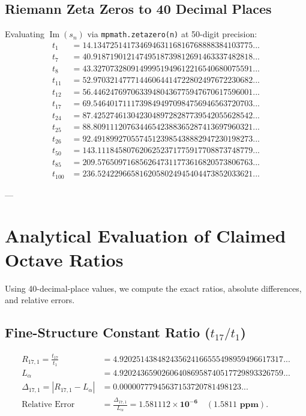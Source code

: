 \documentclass[11pt,a4paper]{article}
\begin{document}
\subsection{Riemann Zeta Zeros to 40 Decimal Places}
Evaluating $\operatorname{Im}(s_n)$ via \texttt{mpmath.zetazero(n)} at 50-digit precision:
\begin{align}
t_1 &= \mathbf{14.13472514173469463116816768888384103775...} \\
t_7 &= \mathbf{40.91871901214749518739812691463337482818...} \\
t_8 &= \mathbf{43.32707328091499951949612216540680075591...} \\
t_{11} &= \mathbf{52.97032147771446064414722802497672230682...} \\
t_{12} &= \mathbf{56.44624769706339480436775947670617596001...} \\
t_{17} &= \mathbf{69.54640171117398494970984756946563720703...} \\
t_{24} &= \mathbf{87.42527461304230489728287739542055628542...} \\
t_{25} &= \mathbf{88.80911120763446542388365287413697960321...} \\
t_{26} &= \mathbf{92.49189927055745123985438882947230198273...} \\
t_{50} &= \mathbf{143.1118458076206252371775917708873748779...} \\
t_{85} &= \mathbf{209.5765097168562647311773616820573806763...} \\
t_{100} &= \mathbf{236.5242296658162058024945404473852033621...}
\end{align}

---

\section{Analytical Evaluation of Claimed Octave Ratios}

Using 40-decimal-place values, we compute the exact ratios, absolute differences, and relative errors.

\subsection{Fine-Structure Constant Ratio (\texorpdfstring{$t_{17} / t_1$}{t17 / t1})}
\begin{align}
R_{17, 1} = \frac{t_{17}}{t_1} &= \mathbf{4.920251438482435624166555498959496617317...} \\
L_\alpha &= \mathbf{4.920243659026064086958740517729893326759...} \\
\Delta_{17, 1} = |R_{17, 1} - L_\alpha| &= \mathbf{0.00000777945637153720781498123...} \\
\text{Relative Error} &= \frac{\Delta_{17, 1}}{L_\alpha} = \mathbf{1.581112 \times 10^{-6} \quad (1.5811 \text{ ppm})}.
\end{align}
\end{document}
